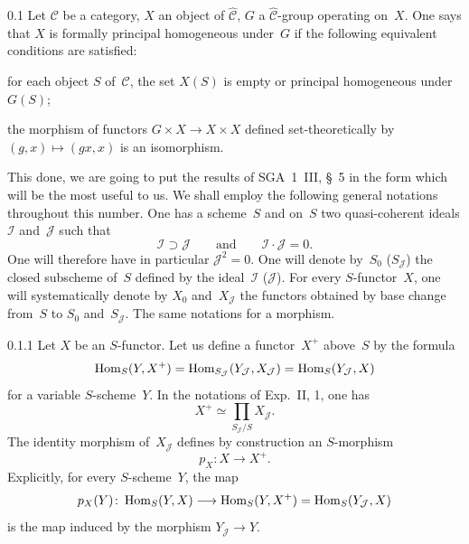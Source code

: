 \begin{definition}{0.1}
\label{III.0.1}
Let \(\mathcal{C}\) be a category, \(X\) an object of
\(\widehat{\mathcal{C}}\), \(G\) a \(\widehat{\mathcal{C}}\)-group
operating on~\(X\). One says that \(X\) is formally principal
homogeneous%
{\renewcommand{\thefootnote}{(3)}}
under~\(G\) if the following equivalent conditions are satisfied:
\begin{enumeratei}
\item for each object \(S\) of~\(\mathcal{C}\), the set \(X(S)\) is empty
or principal homogeneous under \(G(S)\);
\item the morphism of functors \(G\times X\to X\times X\) defined
set-theoretically by \((g,x)\mapsto(gx,x)\) is an isomorphism.
\end{enumeratei}
\end{definition}

This done, we are going to put the results of SGA~1~III, \S~5%
{\renewcommand{\thefootnote}{(4)}}
in the form which will be the most useful to us. We shall employ the
following general notations throughout this number. One has a
scheme~\(S\) and on~\(S\) two quasi-coherent ideals \(\mathcal{I}\)
and~\(\mathcal{J}\) such that
\[
\mathcal{I}\supset\mathcal{J}
\qquad\text{and}\qquad
\mathcal{I}\cdot\mathcal{J}=0.
\]
One will therefore have in particular \(\mathcal{J}^{2}=0\). One will
denote by~\(S_0\) (\resp \(S_{\mathcal{J}}\)) the closed subscheme
of~\(S\) defined by the ideal~\(\mathcal{I}\)
(\resp \(\mathcal{J}\)). For every \(S\)-functor~\(X\), one will
systematically denote by \(X_0\) and~\(X_{\mathcal{J}}\) the functors
obtained by base change from~\(S\) to \(S_0\) and~\(S_{\mathcal{J}}\).
The same notations for a morphism.

\begin{definition}{0.1.1}
\label{III.0.1.1}
{\renewcommand{\thefootnote}{(5)}}%
Let \(X\) be an \(S\)-functor. Let us define a functor~\(X^{+}\)
above~\(S\) by the formula
\[
\operatorname{Hom}_S(Y,X^{+})
=\operatorname{Hom}_{S_{\mathcal{J}}}(Y_{\mathcal{J}},X_{\mathcal{J}})
=\operatorname{Hom}_S(Y_{\mathcal{J}},X)
\]
for a variable \(S\)-scheme~\(Y\). In the notations of Exp.~II, 1, one
has
\[
X^{+}\simeq\prod_{S_{\mathcal{J}}/S}X_{\mathcal{J}}.
\]
The identity morphism of~\(X_{\mathcal{J}}\) defines by construction an
\(S\)-morphism
\[
p_X\colon X\longrightarrow X^{+}.
\]
{\renewcommand{\thefootnote}{(6)}}%
Explicitly, for every \(S\)-scheme~\(Y\), the map
\[
p_X(Y)\colon
\operatorname{Hom}_S(Y,X)\longrightarrow\operatorname{Hom}_S(Y,X^{+})=\operatorname{Hom}_S(Y_{\mathcal{J}},X)
\]
is the map induced by the morphism \(Y_{\mathcal{J}}\to Y\).
\end{definition}

